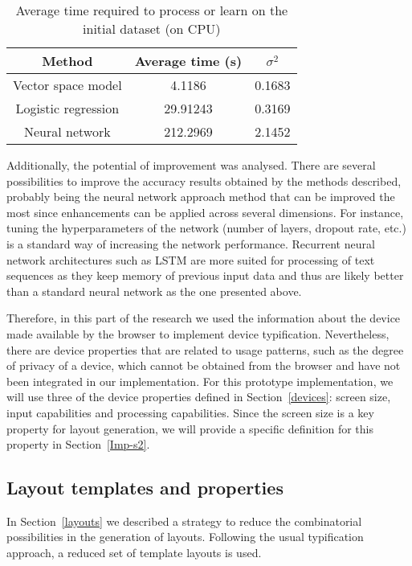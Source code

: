 \begin{table}
	\centering
	\caption{Average time required to process or learn on the initial dataset (on CPU)}
	\label{tab:traintimes}
	\begin{tabular}{||c|c|c||}
		\hline
		\textbf{Method} & \textbf{Average time (s)} & \textbf{$\sigma^2$} \\
		\hline
		Vector space model & 4.1186 & 0.1683\\
		Logistic regression & 29.91243 & 0.3169\\
		Neural network & 212.2969 & 2.1452 \\    
		\hline
	\end{tabular}
\end{table}



Additionally, the potential of improvement was analysed. There are several possibilities to improve the accuracy results obtained by the methods described, probably being the neural network approach method that can be improved the most since enhancements can be applied across several dimensions. For instance, tuning the hyperparameters of the network (number of layers, dropout rate, etc.) is a standard way of increasing the network performance. Recurrent neural network architectures such as LSTM \cite{gers1999learning} are more suited for processing of text sequences as they keep memory of previous input data and thus are likely better than a standard neural network as the one presented above.

Therefore, in this part of the research we used the information about the device made available by the browser to implement device typification. 
Nevertheless, there are device properties that are related to usage patterns, such as the degree of privacy of a device, which cannot be obtained from the browser and have not been integrated in our implementation.
For this prototype implementation, we will use three of the device properties defined in Section~\ref{devices}: screen size, input capabilities and processing capabilities.
Since the screen size is a key property for layout generation, we will provide a specific definition for this property in Section~\ref{Imp-s2}.

\subsection{Layout templates and properties} \label{imp_lay}

In Section~\ref{layouts} we described a strategy to reduce the combinatorial possibilities in the generation of layouts. 
Following the usual typification approach, a reduced set of template layouts is used. 

